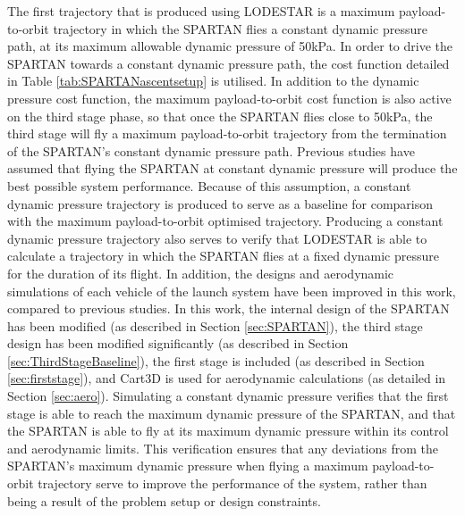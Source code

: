 The first trajectory that is produced using LODESTAR is a maximum payload-to-orbit trajectory in which the SPARTAN flies a constant dynamic pressure path, at its maximum allowable dynamic pressure of 50kPa. In order to drive the SPARTAN towards a constant dynamic pressure path, the cost function detailed in Table \ref{tab:SPARTANascentsetup} is utilised. In addition to the dynamic pressure cost function, the maximum payload-to-orbit cost function is also active on the third stage phase, so that once the SPARTAN flies close to 50kPa, the third stage will fly a maximum payload-to-orbit trajectory from the termination of the SPARTAN's constant dynamic pressure path.
Previous studies have assumed that flying the SPARTAN at constant dynamic pressure will produce the best possible system performance\cite{Preller2017b}. Because of this assumption, a constant dynamic pressure trajectory is produced to serve as a baseline for comparison with the maximum payload-to-orbit optimised trajectory. Producing a constant dynamic pressure trajectory also serves to verify that LODESTAR is able to calculate a trajectory in which the SPARTAN flies at a fixed dynamic pressure for the duration of its flight. 
In addition, the designs and aerodynamic simulations of each vehicle of the launch system have been improved in this work, compared to previous studies\cite{Preller2017b}. In this work, the internal design of the SPARTAN has been modified (as described in Section \ref{sec:SPARTAN}), the third stage design has been modified significantly (as described in Section \ref{sec:ThirdStageBaseline}), the first stage is included (as described in Section \ref{sec:firststage}), and Cart3D\cite{CART3D} is used for aerodynamic calculations (as detailed in Section \ref{sec:aero}). Simulating a constant dynamic pressure verifies that the first stage is able to reach the maximum dynamic pressure of the SPARTAN, and that the SPARTAN is able to fly at its maximum dynamic pressure within its control and aerodynamic limits. This verification ensures that any deviations from the SPARTAN's maximum dynamic pressure when flying a maximum payload-to-orbit trajectory serve to improve the performance of the system, rather than being a result of the problem setup or design constraints. 

